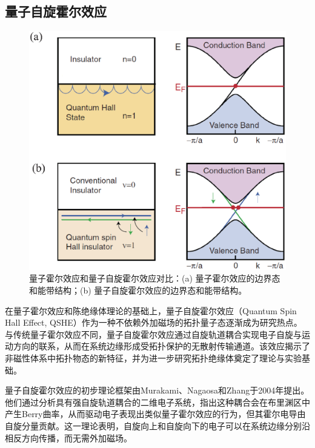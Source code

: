 \subsection{量子自旋霍尔效应}

\begin{figure}[h!]
    \centering
    \includegraphics[width=1\textwidth]{images/fig1-3.eps} 
    \caption{量子霍尔效应和量子自旋霍尔效应对比：(a) 量子霍尔效应的边界态和能带结构；(b) 量子自旋霍尔效应的边界态和能带结构。\cite{r11}}
    \label{fig_1_3}
\end{figure}

在量子霍尔效应和陈绝缘体理论的基础上，量子自旋霍尔效应（Quantum Spin Hall Effect, QSHE）作为一种不依赖外加磁场的拓扑量子态逐渐成为研究热点。与传统量子霍尔效应不同，量子自旋霍尔效应通过自旋轨道耦合实现电子自旋与运动方向的联系，从而在系统边缘形成受拓扑保护的无散射传输通道。该效应揭示了非磁性体系中拓扑物态的新特征，并为进一步研究拓扑绝缘体奠定了理论与实验基础。

量子自旋霍尔效应的初步理论框架由Murakami、Nagaosa和Zhang于2004年提出\cite{e1}。他们通过分析具有强自旋轨道耦合的二维电子系统，指出这种耦合会在布里渊区中产生Berry曲率，从而驱动电子表现出类似量子霍尔效应的行为，但其霍尔电导由自旋分量贡献。这一理论表明，自旋向上和自旋向下的电子可以在系统边缘分别沿相反方向传播，而无需外加磁场。

